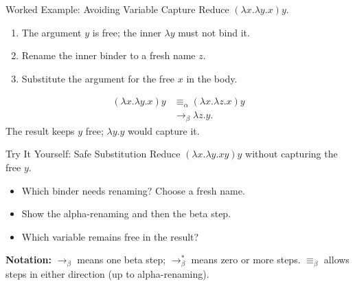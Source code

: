 \documentclass{beamer}
\begin{document}
\begin{frame}{Worked Example: Avoiding Variable Capture}
  Reduce $(\lambda x.\lambda y.x)y$.
  \begin{enumerate}
    \item The argument $y$ is free; the inner $\lambda y$ must not bind it.
    \item Rename the inner binder to a fresh name $z$.
    \item Substitute the argument for the free $x$ in the body.
  \end{enumerate}
  \begin{align*}
    (\lambda x.\lambda y.x)y
      &\equiv_\alpha(\lambda x.\lambda z.x)y\\
      &\to_\beta\lambda z.y.
  \end{align*}
  The result keeps $y$ free; $\lambda y.y$ would capture it.
\end{frame}
\begin{frame}{Try It Yourself: Safe Substitution}
  Reduce $(\lambda x.\lambda y.xy)y$ without capturing the free $y$.
  \begin{itemize}
    \item Which binder needs renaming? Choose a fresh name.
    \item Show the alpha-renaming and then the beta step.
    \item Which variable remains free in the result?
  \end{itemize}
  \textbf{Notation:} $\to_\beta$ means one beta step;
  $\to_\beta^*$ means zero or more steps.
  $\equiv_\beta$ allows steps in either direction (up to alpha-renaming).
\end{frame}
\end{document}
